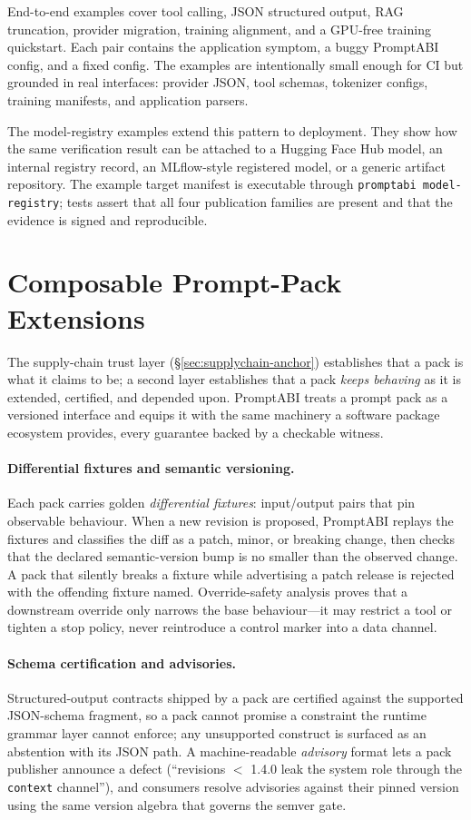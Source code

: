 \documentclass[10pt]{article}
\begin{document}
End-to-end examples cover tool calling, JSON structured output, RAG truncation,
provider migration, training alignment, and a GPU-free training quickstart. Each
pair contains the application symptom, a buggy PromptABI config, and a fixed
config. The examples are intentionally small enough for CI but grounded in real
interfaces: provider JSON, tool schemas, tokenizer configs, training manifests,
and application parsers.

The model-registry examples extend this pattern to deployment. They show how the
same verification result can be attached to a Hugging Face Hub model, an
internal registry record, an MLflow-style registered model, or a generic
artifact repository. The example target manifest is executable through
\texttt{promptabi model-registry}; tests assert that all four publication
families are present and that the evidence is signed and reproducible.

\newpage
\section{Composable Prompt-Pack Extensions}

The supply-chain trust layer (\S\ref{sec:supplychain-anchor}) establishes that a
pack is what it claims to be; a second layer establishes that a pack \emph{keeps
behaving} as it is extended, certified, and depended upon. PromptABI treats a
prompt pack as a versioned interface and equips it with the same machinery a
software package ecosystem provides, every guarantee backed by a checkable
witness.

\paragraph{Differential fixtures and semantic versioning.} Each pack carries
golden \emph{differential fixtures}: input/output pairs that pin observable
behaviour. When a new revision is proposed, PromptABI replays the fixtures and
classifies the diff as a patch, minor, or breaking change, then checks that the
declared semantic-version bump is no smaller than the observed change. A pack
that silently breaks a fixture while advertising a patch release is rejected with
the offending fixture named. Override-safety analysis proves that a downstream
override only narrows the base behaviour---it may restrict a tool or tighten a
stop policy, never reintroduce a control marker into a data channel.

\paragraph{Schema certification and advisories.} Structured-output contracts
shipped by a pack are certified against the supported JSON-schema fragment, so a
pack cannot promise a constraint the runtime grammar layer cannot enforce; any
unsupported construct is surfaced as an abstention with its JSON path. A
machine-readable \emph{advisory} format lets a pack publisher announce a defect
(``revisions $<$ 1.4.0 leak the system role through the \texttt{context}
channel''), and consumers resolve advisories against their pinned version using
the same version algebra that governs the semver gate.
\end{document}
